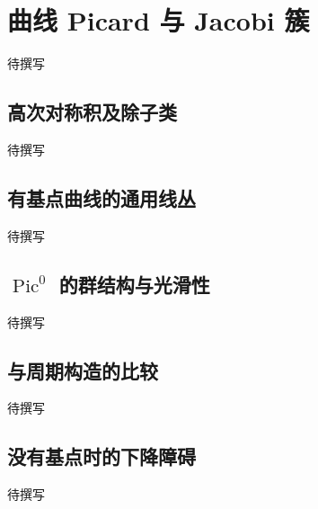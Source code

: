 
% 
% 

\section{曲线 Picard 与 Jacobi 簇}
\label{g5:sec:3305}

待撰写

\subsection{高次对称积及除子类}
\label{g5:subsec:3305:01}
待撰写

\subsection{有基点曲线的通用线丛}
\label{g5:subsec:3305:02}
待撰写

\subsection{\texorpdfstring{\(\operatorname{Pic}^0\) 的群结构与光滑性}{Pic⁰ 的群结构与光滑性}}
\label{g5:subsec:3305:03}
待撰写

\subsection{与周期构造的比较}
\label{g5:subsec:3305:04}
待撰写

\subsection{没有基点时的下降障碍}
\label{g5:subsec:3305:05}
待撰写
